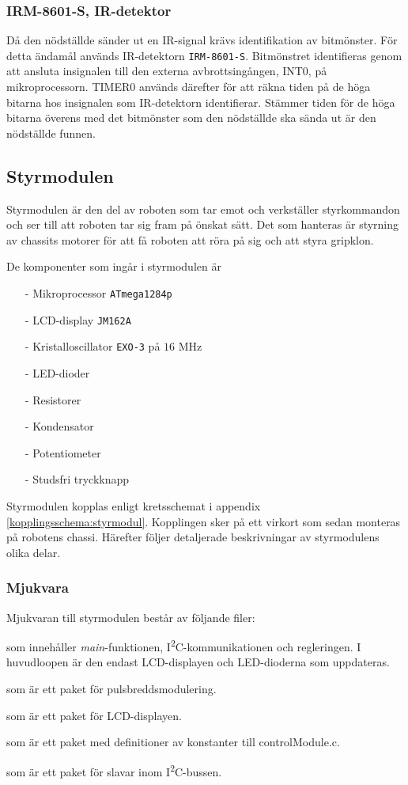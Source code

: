 \documentclass[11pt]{article}
\begin{document}
\begin{flushleft}
\subsubsection{IRM-8601-S, IR-detektor}
Då den nödställde sänder ut en IR-signal krävs identifikation av bitmönster. För detta ändamål används IR-detektorn \verb+IRM-8601-S+. Bitmönstret identifieras genom att ansluta insignalen till den externa avbrottsingången, INT0, på mikroprocessorn. TIMER0 används därefter för att räkna tiden på de höga bitarna hos insignalen som IR-detektorn identifierar. Stämmer tiden för de höga bitarna överens med det bitmönster som den nödställde ska sända ut är den nödställde funnen.

\subsection{Styrmodulen}

Styrmodulen är den del av roboten som tar emot och verkställer styrkommandon och ser till att roboten tar sig fram på önskat sätt. Det som hanteras är styrning av chassits motorer för att få roboten att röra på sig och att styra gripklon. 

De komponenter som ingår i styrmodulen är
\begin{itemize}
  \item[-] Mikroprocessor \verb+ATmega1284p+
  \item[-] LCD-display \verb+JM162A+
  \item[-] Kristalloscillator \verb+EXO-3+ på $16$ MHz
  \item[-] LED-dioder
  \item[-] Resistorer
  \item[-] Kondensator
  \item[-] Potentiometer
  \item[-] Studsfri tryckknapp
\end{itemize}

Styrmodulen kopplas enligt kretsschemat i appendix \ref{kopplingsschema:styrmodul}. Kopplingen sker på ett virkort som sedan monteras på robotens chassi. Härefter följer detaljerade beskrivningar av styrmodulens olika delar.

\subsubsection{Mjukvara}
Mjukvaran till styrmodulen består av följande filer:
\begin{description}[style=unboxed, leftmargin=0cm]
  \item[controlModule.c] som innehåller \textit{main}-funktionen, I\textsuperscript{2}C-kommunikationen och regleringen. I huvudloopen är den endast LCD-displayen och LED-dioderna som uppdateras.
  \item[PWM.h] som är ett paket för pulsbreddsmodulering.
  \item[LCD.h] som är ett paket för LCD-displayen.
  \item[constants.h] som är ett paket med definitioner av konstanter till controlModule.c.
  \item[I2C\_slave.h] som är ett paket för slavar inom I\textsuperscript{2}C-bussen.


\end{description}
\end{flushleft}
\end{document}
